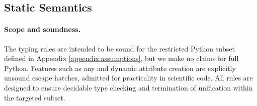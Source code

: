 \subsection{Static Semantics}
\label{subsec:static-semantics}

\paragraph{Scope and soundness.}
The typing rules are intended to be sound for the restricted Python subset
defined in Appendix \ref{appendix:assumptions}, but we make no claims for full Python.
Features such as \textsf{any} and dynamic attribute creation are explicitly
unsound escape hatches, admitted for practicality in scientific code.  
All rules are designed to ensure decidable type checking and termination of unification
within the targeted subset.
